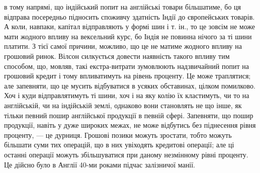 в тому напрямі, що індійський попит на англійські товари більшатиме, бо ця
відправа посередньо підносить споживчу здатність Індії до європейських товарів.
А коли, навпаки, капітал відправляють у формі шин і т. ін., то це зовсім не
може мати жодного впливу на вексельний курс, бо Індія не повинна нічого за
ті шини платити. З тієї самої причини, можливо, що це не матиме жодного
впливу на грошовий ринок. Вілсон силкується довести наявність такого впливу
тим способом, що, мовляв, такі екстра-витрати зумовлюють надзвичайний попит
на грошовий кредит і тому впливатимуть на рівень проценту. Це може траплятися;
але запевняти, що це мусить відбуватися в усяких обставинах, цілком
помилково. Хоч і куди відправлятимуть ті шини, хоч і на яку колію їх кластимуть,
чи то на англійській, чи на індійській землі, однаково вони становлять
не що інше, як тільки певний пошир англійської продукції в певній сфері. Запевняти,
що пошир продукції, навіть у дуже широких межах, не може відбутись
без піднесення рівня проценту, — це дурниця. Грошові позики можуть зростати,
тобто можуть більшати суми тих операцій, що в них увіходять кредитові
операції; але ці останні операції можуть збільшуватися при даному незмінному
рівні проценту. Це дійсно було в Англії 40-ми роками підчас залізничої манії.
\parbreak{}  %
